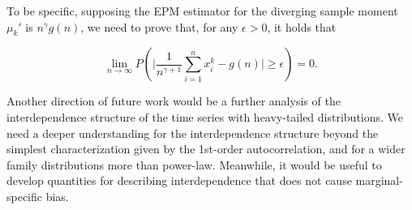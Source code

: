 To be specific, supposing the EPM estimator for the diverging sample moment $ \mu_k' $ is $ n^{\gamma} g(n) $, we need to prove that, for any $ \epsilon>0 $, it holds that 

\begin{equation}
\lim_{n \rightarrow \infty} P \left ( \big | \frac{1}{n^{\gamma+1}} \sum_{i=1}^n x_i^k - g(n) \big | \geq \epsilon \right ) = 0.
\end{equation}

Another direction of future work would be a further analysis of the interdependence structure of the time series with heavy-tailed distributions. We need a deeper understanding for the interdependence structure beyond the simplest characterization given by the 1st-order autocorrelation, and for a wider family distributions more than power-law. Meanwhile, it would be useful to develop quantities for describing interdependence that does not cause marginal-specific bias. 


